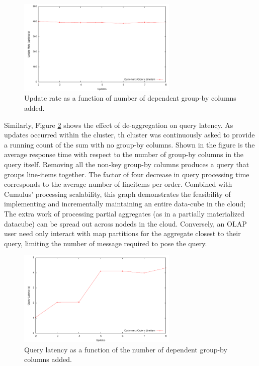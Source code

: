 \begin{figure}
\begin{center}
\includegraphics[width=3.0in]{images/aggvsupdates.pdf}
\caption{Update rate as a function of number of dependent group-by columns added.}
\label{fig:aggvsupdates}
\end{center}
\end{figure}

Similarly, Figure \ref{fig:aggvslatency} shows the effect of de-aggregation on query latency.  As updates occurred within the cluster, th cluster was continuously asked to provide a running count of the sum with no group-by columns.  Shown in the figure is the average response time with respect to the number of group-by columns in the query itself.  Removing all the non-key group-by columns produces a query that groups line-items together.  The factor of four decrease in query processing time corresponds to the average number of lineitems per order.  Combined with Cumulus' processing scalability, this graph demonstrates the feasibility of implementing and incrementally maintaining an entire data-cube in the cloud; The extra work of processing partial aggregates (as in a partially materialized datacube) can be spread out across nodeds in the cloud.  Conversely, an OLAP user need only interact with map partitions for the aggregate closest to their query, limiting the number of message required to pose the query.

\begin{figure}
\begin{center}
\includegraphics[width=3.0in]{images/aggvslatency.pdf}
\caption{Query latency as a function of the number of dependent group-by columns added.}
\label{fig:aggvslatency}
\end{center}
\end{figure}

